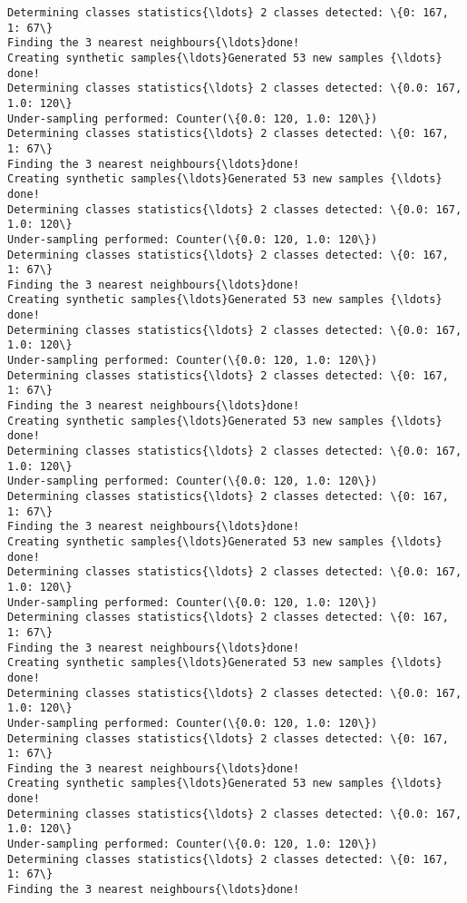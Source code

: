 \documentclass{article}
\begin{document}
    \begin{Verbatim}[commandchars=\\\{\}]
Determining classes statistics{\ldots} 2 classes detected: \{0: 167, 1: 67\}
Finding the 3 nearest neighbours{\ldots}done!
Creating synthetic samples{\ldots}Generated 53 new samples {\ldots}
done!
Determining classes statistics{\ldots} 2 classes detected: \{0.0: 167, 1.0: 120\}
Under-sampling performed: Counter(\{0.0: 120, 1.0: 120\})
Determining classes statistics{\ldots} 2 classes detected: \{0: 167, 1: 67\}
Finding the 3 nearest neighbours{\ldots}done!
Creating synthetic samples{\ldots}Generated 53 new samples {\ldots}
done!
Determining classes statistics{\ldots} 2 classes detected: \{0.0: 167, 1.0: 120\}
Under-sampling performed: Counter(\{0.0: 120, 1.0: 120\})
Determining classes statistics{\ldots} 2 classes detected: \{0: 167, 1: 67\}
Finding the 3 nearest neighbours{\ldots}done!
Creating synthetic samples{\ldots}Generated 53 new samples {\ldots}
done!
Determining classes statistics{\ldots} 2 classes detected: \{0.0: 167, 1.0: 120\}
Under-sampling performed: Counter(\{0.0: 120, 1.0: 120\})
Determining classes statistics{\ldots} 2 classes detected: \{0: 167, 1: 67\}
Finding the 3 nearest neighbours{\ldots}done!
Creating synthetic samples{\ldots}Generated 53 new samples {\ldots}
done!
Determining classes statistics{\ldots} 2 classes detected: \{0.0: 167, 1.0: 120\}
Under-sampling performed: Counter(\{0.0: 120, 1.0: 120\})
Determining classes statistics{\ldots} 2 classes detected: \{0: 167, 1: 67\}
Finding the 3 nearest neighbours{\ldots}done!
Creating synthetic samples{\ldots}Generated 53 new samples {\ldots}
done!
Determining classes statistics{\ldots} 2 classes detected: \{0.0: 167, 1.0: 120\}
Under-sampling performed: Counter(\{0.0: 120, 1.0: 120\})
Determining classes statistics{\ldots} 2 classes detected: \{0: 167, 1: 67\}
Finding the 3 nearest neighbours{\ldots}done!
Creating synthetic samples{\ldots}Generated 53 new samples {\ldots}
done!
Determining classes statistics{\ldots} 2 classes detected: \{0.0: 167, 1.0: 120\}
Under-sampling performed: Counter(\{0.0: 120, 1.0: 120\})
Determining classes statistics{\ldots} 2 classes detected: \{0: 167, 1: 67\}
Finding the 3 nearest neighbours{\ldots}done!
Creating synthetic samples{\ldots}Generated 53 new samples {\ldots}
done!
Determining classes statistics{\ldots} 2 classes detected: \{0.0: 167, 1.0: 120\}
Under-sampling performed: Counter(\{0.0: 120, 1.0: 120\})
Determining classes statistics{\ldots} 2 classes detected: \{0: 167, 1: 67\}
Finding the 3 nearest neighbours{\ldots}done!

\end{Verbatim}
\end{document}
